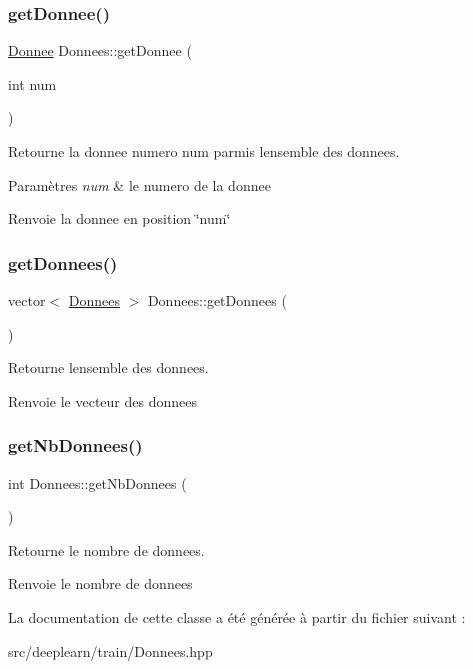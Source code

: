 \subsubsection{\texorpdfstring{get\+Donnee()}{getDonnee()}}
{\footnotesize\ttfamily \hyperlink{class_donnee}{Donnee} Donnees\+::get\+Donnee (\begin{DoxyParamCaption}\item[{int}]{num }\end{DoxyParamCaption})}



Retourne la donnee numero num parmis l\textquotesingle{}ensemble des donnees. 


\begin{DoxyParams}{Paramètres}
{\em num} & le numero de la donnee \\
\hline
\end{DoxyParams}
\begin{DoxyReturn}{Renvoie}
la donnee en position \char`\"{}num\char`\"{} 
\end{DoxyReturn}
\mbox{\label{class_donnees_acb2f30978cb824d70c39b716c49fe1fa}} 
\subsubsection{\texorpdfstring{get\+Donnees()}{getDonnees()}}
{\footnotesize\ttfamily vector$<$ \hyperlink{class_donnees}{Donnees} $>$ Donnees\+::get\+Donnees (\begin{DoxyParamCaption}{ }\end{DoxyParamCaption})}



Retourne l\textquotesingle{}ensemble des donnees. 

\begin{DoxyReturn}{Renvoie}
le vecteur des donnees 
\end{DoxyReturn}
\mbox{\label{class_donnees_a4c4da37884b1b91d881524f2a7b91dbc}} 
\subsubsection{\texorpdfstring{get\+Nb\+Donnees()}{getNbDonnees()}}
{\footnotesize\ttfamily int Donnees\+::get\+Nb\+Donnees (\begin{DoxyParamCaption}{ }\end{DoxyParamCaption})}



Retourne le nombre de donnees. 

\begin{DoxyReturn}{Renvoie}
le nombre de donnees 
\end{DoxyReturn}


La documentation de cette classe a été générée à partir du fichier suivant \+:\begin{DoxyCompactItemize}
\item 
src/deeplearn/train/Donnees.\+hpp\end{DoxyCompactItemize}
